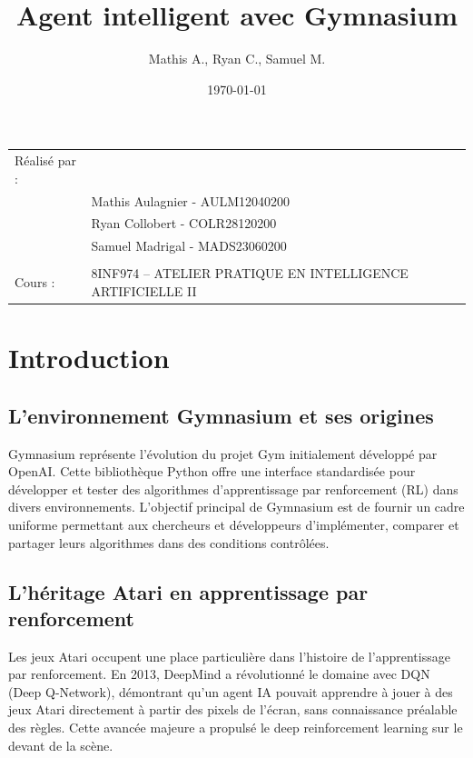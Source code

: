 \documentclass{article}
\title{Agent intelligent avec Gymnasium}
\author{Mathis A., Ryan C., Samuel M.}
\date{\today}
\begin{document}
\maketitle
\noindent\begin{tabular}{@{}ll}
    Réalisé par :\\
        & Mathis Aulagnier - AULM12040200 \\
        & Ryan Collobert - COLR28120200 \\
        & Samuel Madrigal - MADS23060200 \\
        \\
    Cours :  &  8INF974 – ATELIER PRATIQUE EN INTELLIGENCE ARTIFICIELLE II \\
\end{tabular}

\tableofcontents

\clearpage

\section{Introduction}

\subsection{L'environnement Gymnasium et ses origines}

\quad Gymnasium représente l'évolution du projet Gym initialement développé par OpenAI. Cette bibliothèque Python offre une interface standardisée pour développer et tester des algorithmes d'apprentissage par renforcement (RL) dans divers environnements. L'objectif principal de Gymnasium est de fournir un cadre uniforme permettant aux chercheurs et développeurs d'implémenter, comparer et partager leurs algorithmes dans des conditions contrôlées.

\subsection{L'héritage Atari en apprentissage par renforcement}

\quad Les jeux Atari occupent une place particulière dans l'histoire de l'apprentissage par renforcement. En 2013, DeepMind a révolutionné le domaine avec DQN (Deep Q-Network), démontrant qu'un agent IA pouvait apprendre à jouer à des jeux Atari directement à partir des pixels de l'écran, sans connaissance préalable des règles. Cette avancée majeure a propulsé le deep reinforcement learning sur le devant de la scène.\\
\end{document}
